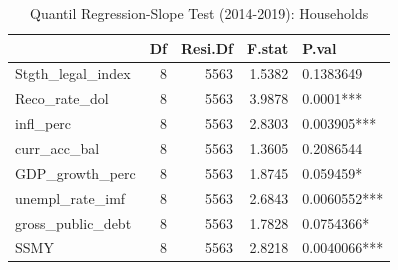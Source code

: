\begin{table}[ht]
\centering
\caption{Quantil Regression-Slope Test (2014-2019): Households} 
\begingroup\small
\begin{tabular}{lrrrl}
  \toprule
 & Df & Resi.Df & F.stat & P.val \\ 
  \midrule
Stgth\_legal\_index & 8 & 5563 & 1.5382 & 0.1383649 \\ 
  Reco\_rate\_dol & 8 & 5563 & 3.9878 & 0.0001*** \\ 
  infl\_perc & 8 & 5563 & 2.8303 & 0.003905*** \\ 
  curr\_acc\_bal & 8 & 5563 & 1.3605 & 0.2086544 \\ 
  GDP\_growth\_perc & 8 & 5563 & 1.8745 & 0.059459* \\ 
  unempl\_rate\_imf & 8 & 5563 & 2.6843 & 0.0060552*** \\ 
  gross\_public\_debt & 8 & 5563 & 1.7828 & 0.0754366* \\ 
  SSMY & 8 & 5563 & 2.8218 & 0.0040066*** \\ 
   \bottomrule
\end{tabular}
\endgroup
\end{table}
